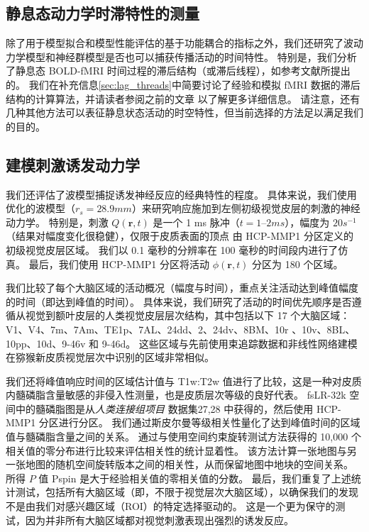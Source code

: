 \documentclass[lang=cn,a4paper,newtx,citestyle=gb7714-2015, bibstyle=gb7714-2015]{elegantpaper}
\begin{document}
\subsection{静息态动力学时滞特性的测量} \label{sec:dynamics_measurement}

除了用于模型拟合和模型性能评估的基于功能耦合的指标之外，我们还研究了波动力学模型和神经群模型是否也可以捕获传播活动的时间特性。
特别是，我们分析了静息态 BOLD-fMRI 时间过程的滞后结构（或滞后线程），如参考文献\cite{mitra2015lag,mitra2014lag}所提出的。
我们在补充信息\ref{sec:lag_threads}中简要讨论了经验和模拟 fMRI 数据的滞后结构的计算算法，并请读者参阅之前的文章\cite{mitra2015lag,mitra2014lag} 以了解更多详细信息。
请注意，还有几种其他方法可以表征静息状态活动的时空特性\cite{bolt2022parsimonious,cabral2017functional,kashyap2019dynamic}，但当前选择的方法足以满足我们的目的。


\subsection{建模刺激诱发动力学} \label{sec:modelling_stimulus}

我们还评估了波模型捕捉诱发神经反应的经典特性的程度。
具体来说，我们使用优化的波模型（$ r_s = 28.9 mm $）来研究响应施加到左侧初级视觉皮层的刺激的神经动力学。
特别是，刺激 $ Q(\boldsymbol{r},t) $ 是一个 1 ms 脉冲（$ t = 1–2 ms $），幅度为 $ 20 s^{-1} $（结果对幅度变化很稳健），仅限于皮质表面的顶点 由 HCP-MMP1 分区定义的 初级视觉皮层区域。
我们以 0.1 毫秒的分辨率在 100 毫秒的时间段内进行了仿真。 
最后，我们使用 HCP-MMP1 分区将活动 $ \phi(\boldsymbol{r},t) $ 分区为 180 个区域。


我们比较了每个大脑区域的活动概况（幅度与时间），重点关注活动达到峰值幅度的时间（即达到峰值的时间）。
具体来说，我们研究了活动的时间优先顺序是否遵循从视觉到额叶皮层的人类视觉皮层层次结构，其中包括以下 17 个大脑区域：V1、V4、7m、7Am、TE1p、7AL、24dd、2、24dv、8BM、10r 、10v、8BL、10pp、10d、9-46v 和 9-46d。
这些区域与先前使用束追踪数据和非线性网络建模在猕猴新皮质视觉层次中识别的区域非常相似\cite{chaudhuri2015large}。


我们还将峰值响应时间的区域估计值与 T1w:T2w 值进行了比较，这是一种对皮质内髓磷脂含量敏感的非侵入性测量\cite{glasser2011mapping}，也是皮质层次等级\cite{burt2018hierarchy}的良好代表。
fsLR-32k 空间中的髓磷脂图是从\textit{人类连接组项目} 数据集27,28 中获得的，然后使用 HCP-MMP1 分区进行分区。
我们通过斯皮尔曼等级相关性量化了达到峰值时间的区域值与髓磷脂含量之间的关系。
通过与使用空间约束旋转测试方法获得的 10,000 个相关值的零分布进行比较来评估相关性的统计显着性\cite{vavsa2018adolescent,alexander2018testing}。
该方法计算一张地图与另一张地图的随机空间旋转版本之间的相关性，从而保留地图中地块的空间关系。
所得 $ P $ 值 Pspin 是大于经验相关值的零相关值的分数。
最后，我们重复了上述统计测试，包括所有大脑区域（即，不限于视觉层次大脑区域），以确保我们的发现不是由我们对感兴趣区域（ROI）的特定选择驱动的。
这是一个更为保守的测试，因为并非所有大脑区域都对视觉刺激表现出强烈的诱发反应。
\end{document}

